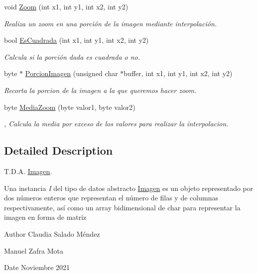 \begin{DoxyCompactItemize}
void \hyperlink{class_imagen_a845f920cc7180b4419025b6e863958f6}{Zoom} (int x1, int y1, int x2, int y2)
\begin{DoxyCompactList}\small\item\em Realiza un zoom en una porción de la imagen mediante interpolación. \end{DoxyCompactList}\item 
bool \hyperlink{class_imagen_aae6fb4b642b1d59482de7920c381bda4}{Es\+Cuadrada} (int x1, int y1, int x2, int y2)
\begin{DoxyCompactList}\small\item\em Calcula si la porción dada es cuadrada o no. \end{DoxyCompactList}\item 
byte $\ast$ \hyperlink{class_imagen_ac59016db29b9e8857e41a5c0e47b213a}{Porcion\+Imagen} (unsigned char $\ast$buffer, int x1, int y1, int x2, int y2)
\begin{DoxyCompactList}\small\item\em Recorta la porcion de la imagen a la que queremos hacer zoom. \end{DoxyCompactList}\item 
byte \hyperlink{class_imagen_a0cd53e6edab66bd64a9e4bec13c77f43}{Media\+Zoom} (byte valor1, byte valor2)
\begin{DoxyCompactList}\small\item\em , Calcula la media por exceso de los valores para realizar la interpolacion. \end{DoxyCompactList}\end{DoxyCompactItemize}


\subsection{Detailed Description}
T.\+D.\+A. \hyperlink{class_imagen}{Imagen}. 

Una instancia {\itshape I} del tipo de datos abstracto {\ttfamily \hyperlink{class_imagen}{Imagen}} es un objeto representado por dos números enteros que representan el número de filas y de columnas respectivamente, así como un array bidimensional de char para representar la imagen en forma de matriz

\begin{DoxyAuthor}{Author}
Claudia Salado Méndez 

Manuel Zafra Mota 
\end{DoxyAuthor}
\begin{DoxyDate}{Date}
Noviembre 2021 
\end{DoxyDate}


